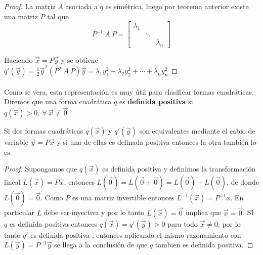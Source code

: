 \begin{proof}
La matriz $A$ asociada a $q$ es simétrica, luego por teorema anterior existe una matriz $P$ tal que 
\begin{equation*}
    P^{-1}~A~P = \begin{bmatrix}
    \lambda_{1} & &\\
    & \ddots & \\
    & & \lambda_{n}
    \end{bmatrix}
    \label{ecuacion:1.4}
\end{equation*}

Haciendo $\overrightarrow{x} = P\overrightarrow{y}$ y se obtiene $q'(\overrightarrow{y}) = \frac{1}{2}\overrightarrow{y}^{T}\left(P^{T}~A~P\right)\overrightarrow{y} = \lambda_{1}y_{1}^{2} + \lambda_{2}y_{2}^{2} + \cdots + \lambda_{n}y_{n}^{2}$

\end{proof}

\paragraph*{}
Como se vera, esta representación es muy útil para clasificar formas cuadráticas. Diremos que una forma cuadrática $q$ es \textbf{definida positiva} si $q(\overrightarrow{x}) > 0, ~\forall~ \overrightarrow{x} \neq \overrightarrow{0}$ 

\begin{lemma}
Si dos formas cuadráticas $q(\overrightarrow{x})$ y $q'(\overrightarrow{y})$ son equivalentes mediante el cabio de variable $\overrightarrow{y} = P\overrightarrow{x}$ y si una de ellas es definada positiva entonces la otra también lo es.
\label{lema:1.3}
\end{lemma}

\begin{proof}
Supongamos que $q(\overrightarrow{x})$ es definida positiva y definimos la transformación lineal $L(\overrightarrow{x}) = P\overrightarrow{x}$, entonces $L(\overrightarrow{0}) = L(\overrightarrow{0}+ \overrightarrow{0}) = L(\overrightarrow{0}) + L(\overrightarrow{0})$, de donde $L(\overrightarrow{0}) = \overrightarrow{0}$. Como $P$ es una matriz invertible entonces $L^{-1}(\overrightarrow{x}) = P^{-1}x$. En particular $L$ debe ser inyectiva y por lo tanto $L(\overrightarrow{x})=\overrightarrow{0}$ implica que $\overrightarrow{x}=\overrightarrow{0}$. SI $q$ es definida positiva entonces $q(\overrightarrow{x}) = q'(\overrightarrow{y}) > 0$ para todo $\overrightarrow{x} \neq 0$; por lo tanto $q'$ es definida positiva , entonces aplicando el mismo razonamiento con $L(\overrightarrow{y}) = P^{-1}\overrightarrow{y}$ se llega a la conclusión de que $q$ tambien es definida positiva. 
\end{proof}

